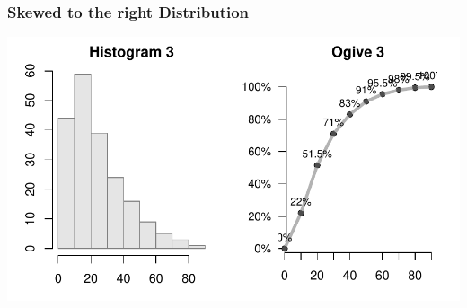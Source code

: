 \documentclass[12pt]{beamer}\usepackage[]{graphicx}\usepackage[]{color}
\newenvironment{knitrout}{}{} %
\begin{document}

\begin{frame}[fragile]
\frametitle{Skewed to the right Distribution}

\begin{knitrout}\footnotesize
{}\color{fgcolor}

{\centering \includegraphics[width=.9\linewidth,height=.5\linewidth]{figure/unnamed-chunk-32-1} 

}



\end{knitrout}

\end{frame}

\end{document}
